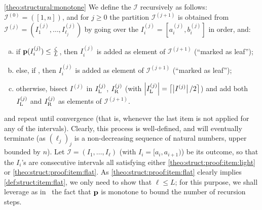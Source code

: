 \begin{proofof}{\cref{theo:structural:monotone}}
We define the $\mathcal{I}$ recursively as follows: $\mathcal{I}^{(0)}=([1,n])$, and for $j \geq 0$ the partition $\mathcal{I}^{(j+1)}$ is obtained from $\mathcal{I}^{(j)}=(I_1^{(j)},\dots,I_{\ell_j}^{(j)})$ by going over the $I^{(j)}_i=[a^{(j)}_i, b^{(j)}_i]$ in order, and:
\begin{enumerate}[(a)]
  \item\label{theo:struct:proof:item:light} if $\mathbf{p}(I^{(j)}_i)\leq \frac{\zeta}{L}$, then $I^{(j)}_i$ is added as element of $\mathcal{I}^{(j+1)}$ (``marked as leaf'');
  \item\label{theo:struct:proof:item:flat} else, if , then $I^{(j)}_i$ is added as element of $\mathcal{I}^{(j+1)}$ (``marked as leaf'');
  \item otherwise, bisect $I^{(j)}$ in $I^{(j)}_{\rm L}$, $I^{(j)}_{\rm R}$ (with $\left\lvert I^{(j)}_{\rm L} \right\rvert=\left\lceil \left\lvert I^{(j)} \right\rvert/2 \right\rceil$) and add both $I^{(j)}_{\rm L}$ and $I^{(j)}_{\rm R}$ as elements of $\mathcal{I}^{(j+1)}$.
\end{enumerate}
and repeat until convergence (that is, whenever the last item is not applied for any of the intervals). Clearly, this process is well-defined, and will eventually terminate (as $(\ell_j)_j$ is a non-decreasing sequence of natural numbers, upper bounded by $n$). Let $\mathcal{I}=(I_1,\dots,I_{\ell})$ (with $I_i=[a_i,a_{i+1})$) be its outcome, so that the $I_i$'s are consecutive intervals all satisfying either \ref{theo:struct:proof:item:light} or \ref{theo:struct:proof:item:flat}. As \ref{theo:struct:proof:item:flat} clearly implies \ref{def:struct:item:flat}, we only need to show that $\ell \leq L$; for this purpose, we shall leverage as in~\cite{BKR:04} the fact that $\mathbf{p}$ is monotone to bound the number of recursion steps.


\end{proofof}
